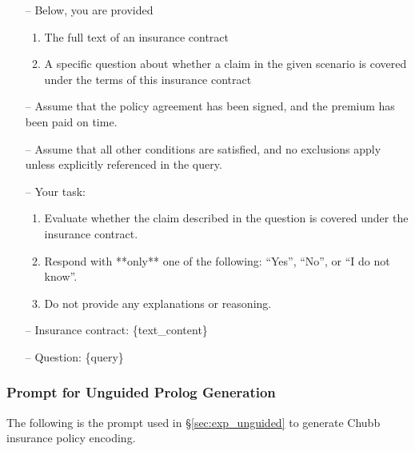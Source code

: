 \begin{itemize}
\item [--] Below, you are provided
    \begin{enumerate}
        \item {The full text of an insurance contract} 
        \item {A specific question about whether a claim in the given scenario is covered under the terms of this insurance contract}
    \end{enumerate}
    
\item [--] Assume that the policy agreement has been signed, and the premium has been paid on time.

\item [--] Assume that all other conditions are satisfied, and no exclusions apply unless explicitly referenced in the query.

\item [--] Your task:
    \begin{enumerate}
        \item Evaluate whether the claim described in the question is covered under the insurance contract.
        \item Respond with **only** one of the following: ``Yes'', ``No'', or ``I do not know''.
        \item Do not provide any explanations or reasoning.
    \end{enumerate}

\item [--] Insurance contract: \{text\_content\}
\item [--] Question: \{query\}

\end{itemize}

\subsubsection{Prompt for Unguided Prolog Generation}
\label{app:prompt_unguided}

The following is the prompt used in \S\ref{sec:exp_unguided} to generate Chubb insurance policy encoding. 

